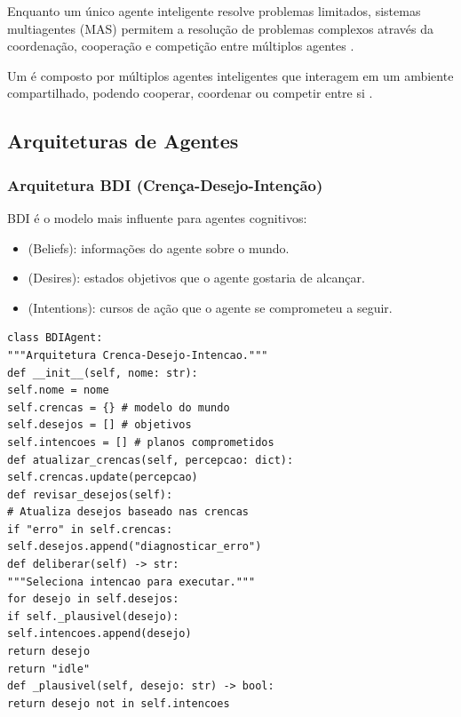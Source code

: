 Enquanto um único agente inteligente resolve problemas limitados, sistemas
multiagentes (MAS) permitem a resolução de problemas complexos através da
coordenação, cooperação e competição entre múltiplos agentes
\cite{wooldridge2009multiagent, weiss2013multiagent}.
\begin{definicao}
Um  é composto por múltiplos agentes
inteligentes que interagem em um ambiente compartilhado, podendo cooperar,
coordenar ou competir entre si \cite{wooldridge2009multiagent}.
\end{definicao}
\subsection{Arquiteturas de Agentes}
\subsubsection*{Arquitetura BDI (Crença-Desejo-Intenção)}
BDI \cite{wooldridge2009multiagent} é o modelo mais influente para agentes
cognitivos:
\begin{itemize}
\item {} (Beliefs): informações do agente sobre o mundo.
\item {} (Desires): estados objetivos que o agente gostaria
de alcançar.
\item {} (Intentions): cursos de ação que o agente se
comprometeu a seguir.
\end{itemize}
\begin{lstlisting}[style=pythonstyle]
class BDIAgent:
"""Arquitetura Crenca-Desejo-Intencao."""
def __init__(self, nome: str):
self.nome = nome
self.crencas = {} # modelo do mundo
self.desejos = [] # objetivos
self.intencoes = [] # planos comprometidos
def atualizar_crencas(self, percepcao: dict):
self.crencas.update(percepcao)
def revisar_desejos(self):
# Atualiza desejos baseado nas crencas
if "erro" in self.crencas:
self.desejos.append("diagnosticar_erro")
def deliberar(self) -> str:
"""Seleciona intencao para executar."""
for desejo in self.desejos:
if self._plausivel(desejo):
self.intencoes.append(desejo)
return desejo
return "idle"
def _plausivel(self, desejo: str) -> bool:
return desejo not in self.intencoes
\end{lstlisting}
